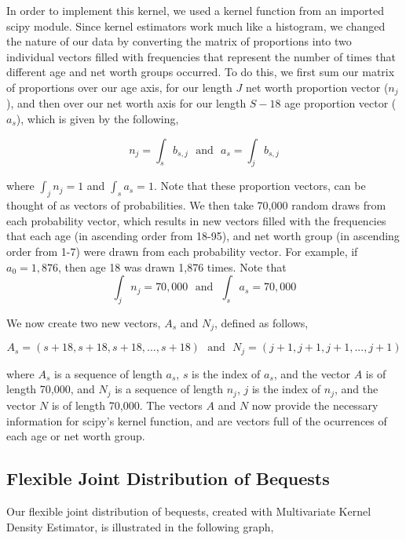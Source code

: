 \documentclass[letterpaper,12pt]{article}
\theoremstyle{definition}
\begin{document}
\begin{spacing}{1.5}
    In order to implement this kernel, we used a kernel function from an imported scipy module. Since kernel estimators work much like a histogram, we changed the nature of our data by converting the matrix of proportions into two individual vectors filled with frequencies that represent the number of times that different age and net worth groups occurred. To do this, we first sum our matrix of proportions over our age axis, for our length $J$ net worth proportion vector ($n_j$), and then over our net worth axis for our length $S-18$ age proportion vector ($a_s$), which is given by the following,

    \[n_j = \int_s b_{s,j}~~~\text{and}~~~a_s = \int_j b_{s,j}\]

    where $\int_j n_j = 1$ and $\int_s a_s = 1$. Note that these proportion vectors, can be thought of as vectors of probabilities. We then take 70,000 random draws from each probability vector, which results in new vectors filled with the frequencies that each age (in ascending order from 18-95), and net worth group (in ascending order from 1-7) were drawn from each probability vector. For example, if $a_0 = 1,876$, then age 18 was drawn 1,876 times. Note that
    \[\int_j n_j = 70,000~~~\text{and}~~~\int_s a_s = 70,000\]

   We now create two new vectors, $A_s$ and $N_j$, defined as follows,

    \[A_{s} = (s+18, s+18,s+18, ... , s+18)~~~\text{and}~~~N_{j} = (j+1, j+1,j+1, ... , j+1)\] 

    where $A_{s}$ is a sequence of length $a_s$, $s$ is the index of $a_s$, and the vector $A$ is of length 70,000, and $N_{j}$ is a sequence of length $n_j$, $j$ is the index of $n_j$, and the vector $N$ is of length 70,000. The vectors $A$ and $N$ now provide the necessary information for scipy's kernel function, and are vectors full of the ocurrences of each age or net worth group.

  \subsection{Flexible Joint Distribution of Bequests}\label{SecDistEst}

    Our flexible joint distribution of bequests, created with Multivariate Kernel Density Estimator, is illustrated in the following graph,\\


\end{spacing}
\end{document}
